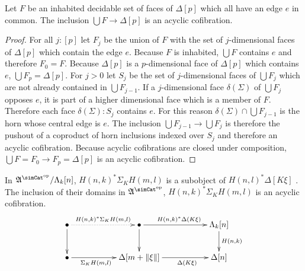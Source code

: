 \documentclass{tac}
\newcommand\ri{^*}
\newcommand\dual{^{\mathrm{op}}}
\newcommand\s{^{\simCat\dual}}
\newcommand\of{:}
\newcommand\simplex\Delta
\newcommand\horn\Lambda
\newcommand\norm[1]{\Vert #1 \Vert}
\newcommand\depsum{\Sigma_}
\newcommand\face\delta
\newcommand\ambient{\mathfrak A}
\begin{document}
\begin{lemma} Let $F$ be an inhabited decidable set of faces of $\simplex[p]$ which all have an edge $e$ in common. The inclusion $\bigcup F\to \simplex[p]$ is an acyclic cofibration. \label{face completion} \end{lemma}

\begin{proof} For all $j\of[p]$ let $F_j$ be the union of $F$ with the set of $j$-dimensional faces of $\simplex[p]$ which contain the edge $e$. Because $F$ is inhabited, $\bigcup F$ contains $e$ and therefore $F_0=F$. Because $\simplex[p]$ is a $p$-dimensional face of $\simplex[p]$ which contains $e$, $\bigcup F_p = \simplex[p]$. For $j>0$ let $S_j$ be the set of $j$-dimensional faces of $\bigcup F_j$ which are not already contained in $\bigcup F_{j-1}$. If a $j$-dimensional face $\face(\Sigma)$ of $\bigcup F_j$ opposes $e$, it is part of a higher dimensional face which is a member of $F$. Therefore each face $\face(\Sigma)\of S_j$ contains $e$. For this reason $\face(\Sigma)\cap \bigcup F_{j-1}$ is the horn whose central edge is $e$. The inclusion $\bigcup F_{j-1}\to\bigcup F_j$ is therefore the pushout of a coproduct of horn inclusions indexed over $S_j$ and therefore an acyclic cofibration. Because acyclic cofibrations are closed under composition, $\bigcup F = F_0\to F_p = \simplex[p]$ is an acyclic cofibration. 
\end{proof}

\begin{lemma} In $\ambient\s/\horn_k[n]$, $H(n,k)\ri \depsum K H(m,l)$ is a subobject of $H(n,l)\ri\simplex[K\xi]$ . The inclusion of their domains in $\ambient\s$, $H(n,k)\ri \depsum K H(m,l)$ is an acyclic cofibration. \label{acyclic cofibrancy} 
\[\xymatrix{
\bullet \ar@{.>}[rr]^{H(n,k)\ri \depsum K H(m,l)} \ar[d] && \bullet\ar[rr]^{H(n,k)\ri\simplex(K\xi)}\ar[d] && \horn_k[n]\ar[d]^{H(n,k)}\\
\bullet\ar[rr]_(.4){\depsum K H(m,l)} && \simplex[m+\norm\xi]\ar[rr]_(.6){\simplex(K\xi)} && \simplex[n]
}\]
\end{lemma}
\end{document}
